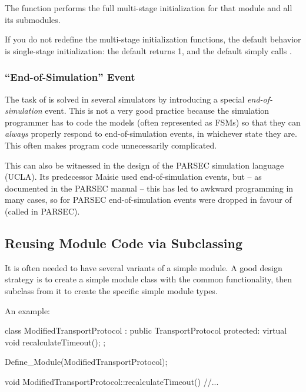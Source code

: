 The  function performs the full multi-stage initialization
for that module and all its submodules.

If you do not redefine the multi-stage initialization functions, the
default behavior is single-stage initialization: the default
 returns 1, and the default 
simply calls .


\subsubsection{``End-of-Simulation'' Event}


The task of  is solved in several simulators
by introducing a special \textit{end-of-simulation} event.
This is not a very good practice because the simulation programmer has to
code the models (often represented as FSMs) so that they can \textit{always}
properly respond to end-of-simulation events, in whichever state they are. This
often makes program code unnecessarily complicated.

This can also be witnessed in the design of the PARSEC
simulation language (UCLA). Its predecessor Maisie used
end-of-simulation events, but -- as documented in the PARSEC manual --
this has led to awkward programming in many cases, so for PARSEC
end-of-simulation events were dropped in favour of 
(called  in PARSEC).



\subsection{Reusing Module Code via Subclassing}
\label{sec:simple-modules:module-subclassing}

It is often needed to have several variants of a simple module.
A good design strategy is to create a simple module class with
the common functionality, then subclass from it to create the
specific simple module types.


An example:

\begin{cpp}
class ModifiedTransportProtocol : public TransportProtocol
{
  protected:
    virtual void recalculateTimeout();
};

Define_Module(ModifiedTransportProtocol);

void ModifiedTransportProtocol::recalculateTimeout()
{
    //...
}
\end{cpp}




